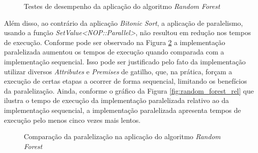 \begin{figure}[!htb]
  \centering
  \caption{Testes de desempenho da aplicação do algoritmo \textit{Random
  Forest}}
  \label{fig:rf_bench}
  \end{figure}

Além disso, ao contrário da aplicação \textit{Bitonic Sort}, a aplicação de
paralelismo, usando a função \textit{SetValue<NOP::Parallel>}, não resultou em
redução nos tempos de execução. Conforme pode ser observado na Figura
\ref{fig:random_forest_par} a implementação paralelizada aumentou os tempos de
execução quando comparada com a implementação sequencial. Isso pode ser
justificado pelo fato da implementação utilizar diversos \textit{Attributes} e
\textit{Premises} de gatilho, que, na prática, forçam a execução de certas
etapas a ocorrer de forma sequencial, limitando os benefícios da paralelização.
Ainda, conforme o gráfico da Figura \ref{fig:random_forest_rel} que ilustra o
tempo de execução da implementação paralelizada relativo ao da implementação
sequencial, a implementação paralelizada apresenta tempos de execução pelo menos
cinco vezes mais lentos.

\begin{figure}[!htb]
\centering
{}
\caption{Comparação da paralelização na aplicação do algoritmo \textit{Random
Forest}}
\label{fig:random_forest_par}
\end{figure}

